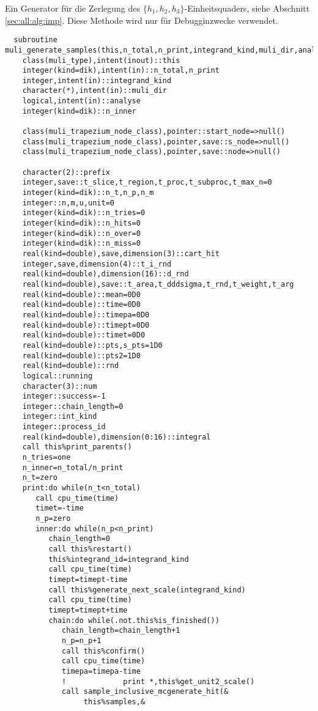 Ein Generator für die Zerlegung des $\{h_1,h_2,h_3\}$-Einheitsquaders, siehe Abschnitt \ref{sec:all:alg:imp}. Diese Methode wird nur für Debugginzwecke verwendet.
\begin{Verbatim}
  subroutine muli_generate_samples(this,n_total,n_print,integrand_kind,muli_dir,analyse)
    class(muli_type),intent(inout)::this
    integer(kind=dik),intent(in)::n_total,n_print
    integer,intent(in)::integrand_kind
    character(*),intent(in)::muli_dir
    logical,intent(in)::analyse
    integer(kind=dik)::n_inner

    class(muli_trapezium_node_class),pointer::start_node=>null()
    class(muli_trapezium_node_class),pointer,save::s_node=>null()
    class(muli_trapezium_node_class),pointer,save::node=>null()   

    character(2)::prefix
    integer,save::t_slice,t_region,t_proc,t_subproc,t_max_n=0
    integer(kind=dik)::n_t,n_p,n_m
    integer::n,m,u,unit=0
    integer(kind=dik)::n_tries=0
    integer(kind=dik)::n_hits=0
    integer(kind=dik)::n_over=0
    integer(kind=dik)::n_miss=0
    real(kind=double),save,dimension(3)::cart_hit
    integer,save,dimension(4)::t_i_rnd
    real(kind=double),dimension(16)::d_rnd
    real(kind=double),save::t_area,t_dddsigma,t_rnd,t_weight,t_arg
    real(kind=double)::mean=0D0
    real(kind=double)::time=0D0
    real(kind=double)::timepa=0D0
    real(kind=double)::timept=0D0
    real(kind=double)::timet=0D0
    real(kind=double)::pts,s_pts=1D0
    real(kind=double)::pts2=1D0
    real(kind=double)::rnd
    logical::running
    character(3)::num
    integer::success=-1
    integer::chain_length=0
    integer::int_kind
    integer::process_id
    real(kind=double),dimension(0:16)::integral
    call this%print_parents()
    n_tries=one
    n_inner=n_total/n_print
    n_t=zero
    print:do while(n_t<n_total)
       call cpu_time(time)
       timet=-time
       n_p=zero
       inner:do while(n_p<n_print)
          chain_length=0
          call this%restart()
          this%integrand_id=integrand_kind
          call cpu_time(time)
          timept=timept-time
          call this%generate_next_scale(integrand_kind)
          call cpu_time(time)
          timept=timept+time
          chain:do while(.not.this%is_finished())
             chain_length=chain_length+1
             n_p=n_p+1
             call this%confirm()
             call cpu_time(time)
             timepa=timepa-time
             !             print *,this%get_unit2_scale()
             call sample_inclusive_mcgenerate_hit(&
                  this%samples,&

\end{Verbatim}
